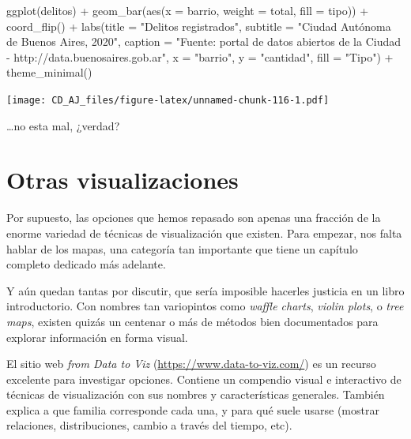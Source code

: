 \documentclass[
]{book}
\newenvironment{Shaded}{\begin{snugshade}}{\end{snugshade}}
\newcommand{\AttributeTok}[1]{\textcolor[rgb]{0.77,0.63,0.00}{#1}}
\newcommand{\FunctionTok}[1]{\textcolor[rgb]{0.00,0.00,0.00}{#1}}
\newcommand{\NormalTok}[1]{#1}
\newcommand{\SpecialCharTok}[1]{\textcolor[rgb]{0.00,0.00,0.00}{#1}}
\newcommand{\StringTok}[1]{\textcolor[rgb]{0.31,0.60,0.02}{#1}}
\begin{document}
\begin{Shaded}
\begin{Highlighting}[]
\FunctionTok{ggplot}\NormalTok{(delitos) }\SpecialCharTok{+}
    \FunctionTok{geom\_bar}\NormalTok{(}\FunctionTok{aes}\NormalTok{(}\AttributeTok{x =}\NormalTok{ barrio, }\AttributeTok{weight =}\NormalTok{ total, }\AttributeTok{fill =}\NormalTok{ tipo)) }\SpecialCharTok{+}
    \FunctionTok{coord\_flip}\NormalTok{() }\SpecialCharTok{+}
    \FunctionTok{labs}\NormalTok{(}\AttributeTok{title =} \StringTok{"Delitos registrados"}\NormalTok{,}
         \AttributeTok{subtitle =} \StringTok{"Ciudad Autónoma de Buenos Aires, 2020"}\NormalTok{,}
         \AttributeTok{caption =} \StringTok{"Fuente: portal de datos abiertos de la Ciudad {-} http://data.buenosaires.gob.ar"}\NormalTok{,}
         \AttributeTok{x =} \StringTok{"barrio"}\NormalTok{,}
         \AttributeTok{y =} \StringTok{"cantidad"}\NormalTok{,}
         \AttributeTok{fill =} \StringTok{"Tipo"}\NormalTok{) }\SpecialCharTok{+}
    \FunctionTok{theme\_minimal}\NormalTok{()}
\end{Highlighting}
\end{Shaded}

\texttt{[image: CD\_AJ\_files/figure-latex/unnamed-chunk-116-1.pdf]}

\ldots no esta mal, ¿verdad?

\hypertarget{otras-visualizaciones}{%
\section{Otras visualizaciones}\label{otras-visualizaciones}}

Por supuesto, las opciones que hemos repasado son apenas una fracción de la enorme variedad de técnicas de visualización que existen. Para empezar, nos falta hablar de los mapas, una categoría tan importante que tiene un capítulo completo dedicado más adelante.

Y aún quedan tantas por discutir, que sería imposible hacerles justicia en un libro introductorio. Con nombres tan variopintos como \emph{waffle charts}, \emph{violin plots}, o \emph{tree maps}, existen quizás un centenar o más de métodos bien documentados para explorar información en forma visual.

El sitio web \emph{from Data to Viz} (\url{https://www.data-to-viz.com/}) es un recurso excelente para investigar opciones. Contiene un compendio visual e interactivo de técnicas de visualización con sus nombres y características generales. También explica a que familia corresponde cada una, y para qué suele usarse (mostrar relaciones, distribuciones, cambio a través del tiempo, etc).
\end{document}
